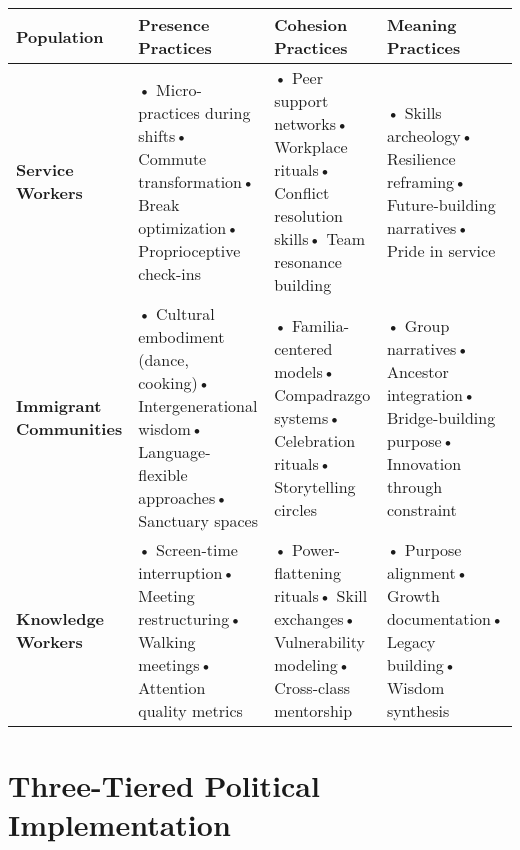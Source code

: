\documentclass[
  a4paper,
]{report}
\begin{document}
\begin{landscape}

\begin{longtable}[]{@{}
  >{\raggedright\arraybackslash}p{}
  >{\raggedright\arraybackslash}p{}
  >{\raggedright\arraybackslash}p{}
  >{\raggedright\arraybackslash}p{}@{}}
\toprule\noalign{}
\begin{minipage}[b]{\linewidth}\raggedright
Population
\end{minipage} & \begin{minipage}[b]{\linewidth}\raggedright
Presence Practices
\end{minipage} & \begin{minipage}[b]{\linewidth}\raggedright
Cohesion Practices
\end{minipage} & \begin{minipage}[b]{\linewidth}\raggedright
Meaning Practices
\end{minipage} \\
\midrule\noalign{}
\endhead
\bottomrule\noalign{}
\endlastfoot
\textbf{Service Workers} & • Micro-practices during shifts• Commute
transformation• Break optimization• Proprioceptive check-ins & • Peer
support networks• Workplace rituals• Conflict resolution skills• Team
resonance building & • Skills archeology• Resilience reframing•
Future-building narratives• Pride in service \\
\textbf{Immigrant Communities} & • Cultural embodiment (dance, cooking)•
Intergenerational wisdom• Language-flexible approaches• Sanctuary spaces
& • Familia-centered models• Compadrazgo systems• Celebration rituals•
Storytelling circles & • Group narratives• Ancestor integration•
Bridge-building purpose• Innovation through constraint \\
\textbf{Knowledge Workers} & • Screen-time interruption• Meeting
restructuring• Walking meetings• Attention quality metrics & •
Power-flattening rituals• Skill exchanges• Vulnerability modeling•
Cross-class mentorship & • Purpose alignment• Growth documentation•
Legacy building• Wisdom synthesis \\
\end{longtable}

\end{landscape}

\section{Three-Tiered Political
Implementation}\label{three-tiered-political-implementation}
\end{document}
